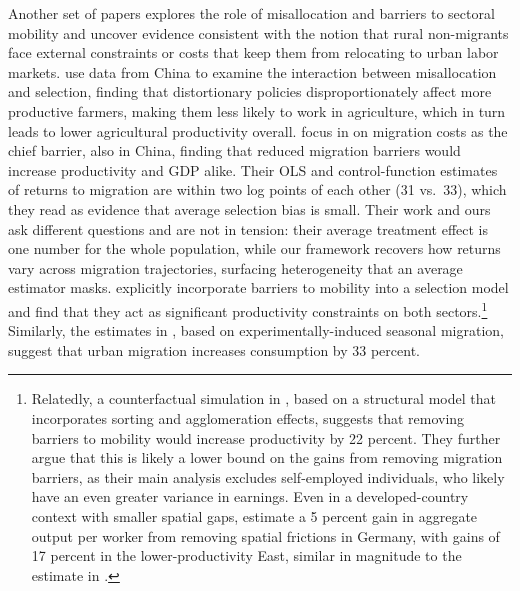 Another set of papers explores the role of misallocation and barriers to sectoral mobility and uncover evidence consistent with the notion that rural non-migrants face external constraints or costs that keep them from relocating to urban labor markets.
\cite{adamopoulosMisallocationSelectionProductivity2022} use data from China to examine the interaction between misallocation and selection, finding that distortionary policies disproportionately affect more productive farmers, making them less likely to work in agriculture, which in turn leads to lower agricultural productivity overall.
\cite{gaiRuralPensionsLabor2025} focus in on migration costs as the chief barrier, also in China, finding that reduced migration barriers would increase productivity and GDP alike.
Their OLS and control-function estimates of returns to migration are within two log points of each other (31 vs.\ 33), which they read as evidence that average selection bias is small.
Their work and ours ask different questions and are not in tension: their average treatment effect is one number for the whole population, while our framework recovers how returns vary across migration trajectories, surfacing heterogeneity that an average estimator masks.
\cite{pulidoBarriersMobilitySorting2021} explicitly incorporate barriers to mobility into a selection model and find that they act as significant productivity constraints on both sectors.\footnote{Relatedly, a counterfactual simulation in \cite{bryanAggregateProductivityEffects2019}, based on a structural model that incorporates sorting and agglomeration effects, suggests that removing barriers to mobility would increase productivity by 22 percent. They further argue that this is likely a lower bound on the gains from removing migration barriers, as their main analysis excludes self-employed individuals, who likely have an even greater variance in earnings. Even in a developed-country context with smaller spatial gaps, \cite{heiseLaborMisallocation2023} estimate a 5 percent gain in aggregate output per worker from removing spatial frictions in Germany, with gains of 17 percent in the lower-productivity East, similar in magnitude to the estimate in \citet{bryanAggregateProductivityEffects2019}.}
Similarly, the estimates in \cite{bryanUnderinvestmentProfitableTechnology2014}, based on experimentally-induced seasonal migration, suggest that urban migration increases consumption by 33 percent. 

